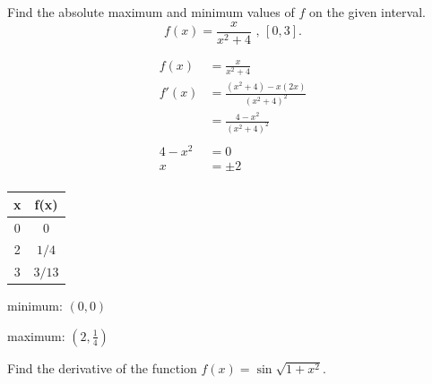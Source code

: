 \documentclass[fleqn,addpoints]{exam}
\begin{document}
\begin{questions}

\ifprintanswers
\pagebreak
\fi

\question
Find the absolute maximum and minimum values of $f$ on the given interval. 
\[
  f(x) = \frac{x}{x^2 + 4} \text{ , } [0, 3].
\]

\begin{solution}
\begin{align*}
  f(x) &= \frac{x}{x^2 + 4} \\
  f'(x) &= \frac{(x^2 + 4) - x(2x)}{(x^2 + 4)^2} \\
        &= \frac{4 - x^2}{(x^2 + 4)^2} \\
\\
  4 - x^2 &= 0 \\
  x &= \pm 2 \\
\end{align*}

\begin{tabular}{cc}
\toprule
x & f(x) \\
\midrule
0 & 0 \\
2 & $1/4$ \\
3 & $3/13$ \\
\bottomrule
\end{tabular}

\begin{itemize*}
\item minimum: $(0, 0)$
\item maximum: $\left(2, \frac{1}{4} \right)$
\end{itemize*}

\end{solution}

\ifprintanswers
\pagebreak
\fi

\question
Find the derivative of the function $f(x) = \sin \sqrt{1 + x^2}$.


\end{questions}
\end{document}
